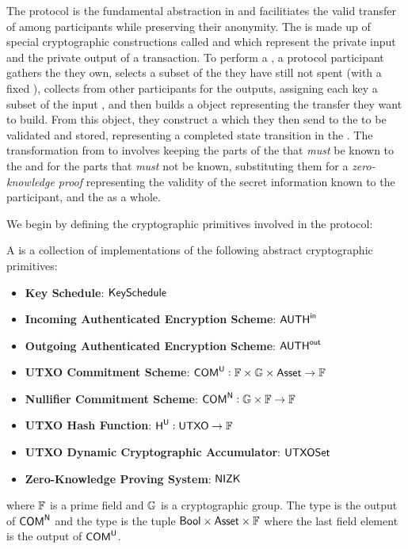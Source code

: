 The \Transfer{} protocol is the fundamental abstraction in \MantaPay{} and facilitiates the valid transfer of  among participants while preserving their anonymity. The \Transfer{} is made up of special cryptographic constructions called  and  which represent the private input and the private output of a transaction. To perform a \Transfer{}, a protocol participant gathers the  they own, selects a subset of the  they have still not spent (with a fixed \AssetId{}), collects  from other participants for the outputs, assigning each key a subset of the input , and then builds a \Transfer{} object representing the transfer they want to build. From this \Transfer{} object, they construct a \TransferPost{} which they then send to the \Ledger{} to be validated and stored, representing a completed state transition in the \Ledger{}. The transformation from \Transfer{} to \TransferPost{} involves keeping the parts of the \Transfer{} that \emph{must} be known to the \Ledger{} and for the parts that \emph{must} not be known, substituting them for a \emph{zero-knowledge proof} representing the validity of the secret information known to the participant, and the \Transfer{} as a whole.

We begin by defining the cryptographic primitives involved in the \Transfer{} protocol:

\begin{definition}
    A \TransferConfiguration{} is a collection of implementations of the following abstract cryptographic primitives:
    \begin{itemize}
        \item \textbf{Key Schedule}: ${\textsf{KeySchedule}}$
        \item \textbf{Incoming Authenticated Encryption Scheme}: ${{\textsf{AUTH}}^\textsf{in}}$
        \item \textbf{Outgoing Authenticated Encryption Scheme}: ${{\textsf{AUTH}}^\textsf{out}}$
        \item \textbf{UTXO Commitment Scheme}: ${\textsf{COM}}^{{\textsf{U}}} : {\mathbb{F}} \times {\mathbb{G}} \times {\textsf{Asset}} \to {\mathbb{F}}$
        \item \textbf{Nullifier Commitment Scheme}: ${\textsf{COM}}^{{\textsf{N}}} : {\mathbb{G}} \times {\mathbb{F}} \to {\mathbb{F}}$
        \item \textbf{UTXO Hash Function}: ${\textsf{H}}^{{\textsf{U}}} : {\textsf{UTXO}} \to {\mathbb{F}}$
        \item \textbf{UTXO Dynamic Cryptographic Accumulator}: ${\textsf{UTXOSet}}$
        \item \textbf{Zero-Knowledge Proving System}: ${\textsf{NIZK}}$
    \end{itemize}
    where ${\mathbb{F}}$ is a prime field and ${\mathbb{G}}$ is a cryptographic group. The \Nullifier{} type is the output of ${\textsf{COM}}^{\textsf{N}}$ and the \UTXO{} type is the tuple ${\textsf{Bool}} \times {\textsf{Asset}} \times {\mathbb{F}}$ where the last field element is the output of ${\textsf{COM}}^{{\textsf{U}}}$.
\end{definition}

